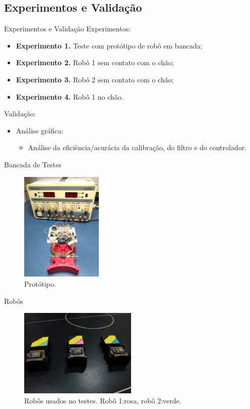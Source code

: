 \subsection{Experimentos e Validação}
\begin{frame}{Experimentos e Validação}
Experimentos:    
    \begin{itemize}
        \item \textbf{Experimento 1.} Teste com protótipo de robô em bancada;
        \item \textbf{Experimento 2.} Robô 1 sem contato com o chão;
        \item \textbf{Experimento 3.} Robô 2 sem contato com o chão;
        \item \textbf{Experimento 4.} Robô 1 no chão.
    \end{itemize}

Validação:

    \begin{itemize}
        \item Análise gráfica:
            \begin{itemize}
                \item Análise da eficiência/acurácia da calibração, do filtro e do controlador.
            \end{itemize}
    \end{itemize}
    
\end{frame}

\begin{frame}{Bancada de Testes}
    \begin{figure}
        \centering
        \includegraphics[width=0.35\textwidth]{figuras/robos/teste_de_bancada.jpg}
        \caption{Protótipo.}
    \end{figure}
\end{frame}

\begin{frame}{Robôs}
    \begin{figure}
        \centering
        \includegraphics[width=0.5\textwidth]{figuras/robos/robos_capa_aberta.jpg}
        \caption{Robôs usados no testes. Robô 1:rosa, robô 2:verde.}
    \end{figure}
\end{frame}

